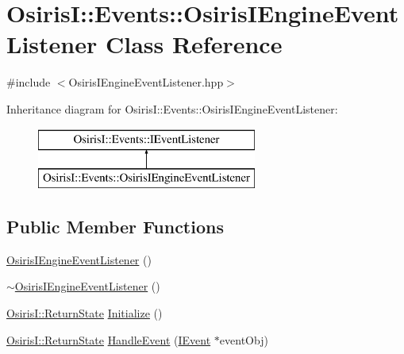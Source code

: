 \hypertarget{class_osiris_i_1_1_events_1_1_osiris_i_engine_event_listener}{\section{Osiris\-I\-:\-:Events\-:\-:Osiris\-I\-Engine\-Event\-Listener Class Reference}
\label{class_osiris_i_1_1_events_1_1_osiris_i_engine_event_listener}
}


{\ttfamily \#include $<$Osiris\-I\-Engine\-Event\-Listener.\-hpp$>$}

Inheritance diagram for Osiris\-I\-:\-:Events\-:\-:Osiris\-I\-Engine\-Event\-Listener\-:\begin{figure}[H]
\begin{center}
\leavevmode
\includegraphics[height=2.000000cm]{class_osiris_i_1_1_events_1_1_osiris_i_engine_event_listener}
\end{center}
\end{figure}
\subsection*{Public Member Functions}
\begin{DoxyCompactItemize}
\item 
\hyperlink{class_osiris_i_1_1_events_1_1_osiris_i_engine_event_listener_ab8db145b92c61989488c4d08050952e5}{Osiris\-I\-Engine\-Event\-Listener} ()
\item 
\hyperlink{class_osiris_i_1_1_events_1_1_osiris_i_engine_event_listener_aaba2ea0bad127dc333cda28f0466c8f4}{$\sim$\-Osiris\-I\-Engine\-Event\-Listener} ()
\item 
\hyperlink{namespace_osiris_i_a8f53bf938dc75c65c6a529694514013e}{Osiris\-I\-::\-Return\-State} \hyperlink{class_osiris_i_1_1_events_1_1_osiris_i_engine_event_listener_a3630b799645a0a023b4952a7f0b77775}{Initialize} ()
\item 
\hyperlink{namespace_osiris_i_a8f53bf938dc75c65c6a529694514013e}{Osiris\-I\-::\-Return\-State} \hyperlink{class_osiris_i_1_1_events_1_1_osiris_i_engine_event_listener_a3ec525ae7721db9cec2c798e2ec38cbd}{Handle\-Event} (\hyperlink{struct_osiris_i_1_1_events_1_1_i_event}{I\-Event} $\ast$event\-Obj)
\end{DoxyCompactItemize}
